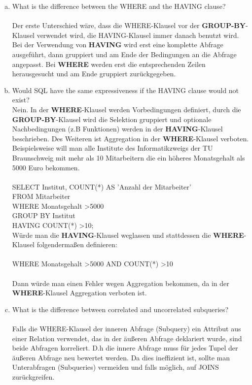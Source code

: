 \documentclass[11pt,a4paper,DIV=9]{scrartcl}
\begin{document}
\begin{enumerate}[a.]
\item What is the difference between the WHERE and the HAVING clause? \hfill\\\\
 Der erste Unterschied w\"are, dass die WHERE-Klausel vor der \textbf{GROUP-BY}-Klausel verwendet wird, die HAVING-Klausel immer danach benutzt wird. Bei der Verwendung von \textbf{HAVING} wird erst eine komplette Abfrage ausgef\"uhrt, dann gruppiert und am Ende der Bedingungen an die Abfrage angepasst. Bei \textbf{WHERE} werden erst die entsprechenden Zeilen herausgesucht und am Ende gruppiert zur\"uckgegeben. \\
\item Would SQL have the same expressiveness if the HAVING clause would not exist? \hfill\\
Nein. In der \textbf{WHERE}-Klausel werden Vorbedingungen definiert, durch die \textbf{GROUP-BY}-Klausel wird die Selektion gruppiert und optionale Nachbedingungen (z.B Funktionen) werden in der \textbf{HAVING}-Klausel beschrieben. Des Weiteren ist Aggregation in der \textbf{WHERE}-Klausel verboten. Beispielsweise will man alle Institute des Informatikzweigs der TU Braunschweig mit mehr als 10 Mitarbeitern die ein h\"oheres Monatsgehalt als 5000 Euro bekommen. \\\\
SELECT Institut, COUNT(*) AS 'Anzahl der Mitarbeiter' \\
FROM Mitarbeiter \\
WHERE Monatsgehalt \textgreater 5000 \\
GROUP BY Institut \\
HAVING COUNT(*) \textgreater 10; \\
W\"urde man die \textbf{HAVING}-Klausel weglassen und stattdessen die \textbf{WHERE}-Klausel folgenderma{\ss}en definieren: \\\\
WHERE Monatsgehalt \textgreater 5000 AND COUNT(*) \textgreater 10 \\\\
Dann w\"urde man einen Fehler wegen Aggregation bekommen, da in der \textbf{WHERE}-Klausel Aggregation verboten ist. \\
\item What is the difference between correlated and uncorrelated subqueries? \hfill\\\\
Falls die WHERE-Klausel der inneren Abfrage (Subquery) ein Attribut aus einer Relation verwendet, das in der \"au{\ss}eren Abfrage deklariert wurde, sind beide Abfragen korreliert. D.h die innere Abfrage muss f\"ur jedes Tupel der \"au{\ss}eren Abfrage neu bewertet werden. Da dies ineffizient ist, sollte man Unterabfragen (Subqueries) vermeiden und falls m\"oglich, auf JOINS zur\"uckgreifen. \\

\end{enumerate}
\end{document}
